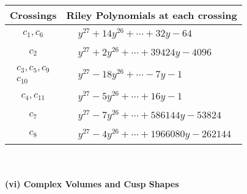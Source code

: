 \documentclass[1p]{elsarticle_modified}
\theoremstyle{definition}
\begin{document}
\begin{tabular}{m{50pt}|m{274pt}}
Crossings & \hspace{64pt}Riley Polynomials at each crossing \\
\hline $$\begin{aligned}c_{1},c_{6}\end{aligned}$$&$\begin{aligned}
&y^{27}+14 y^{26}+\cdots+32 y-64
\end{aligned}$\\
\hline $$\begin{aligned}c_{2}\end{aligned}$$&$\begin{aligned}
&y^{27}+2 y^{26}+\cdots+39424 y-4096
\end{aligned}$\\
\hline $$\begin{aligned}c_{3},c_{5},c_{9}\\c_{10}\end{aligned}$$&$\begin{aligned}
&y^{27}-18 y^{26}+\cdots-7 y-1
\end{aligned}$\\
\hline $$\begin{aligned}c_{4},c_{11}\end{aligned}$$&$\begin{aligned}
&y^{27}-5 y^{26}+\cdots+16 y-1
\end{aligned}$\\
\hline $$\begin{aligned}c_{7}\end{aligned}$$&$\begin{aligned}
&y^{27}-7 y^{26}+\cdots+586144 y-53824
\end{aligned}$\\
\hline $$\begin{aligned}c_{8}\end{aligned}$$&$\begin{aligned}
&y^{27}-4 y^{26}+\cdots+1966080 y-262144
\end{aligned}$\\
\hline
\end{tabular}\\~\\
\newpage\flushleft \textbf{(vi) Complex Volumes and Cusp Shapes}
\end{document}
